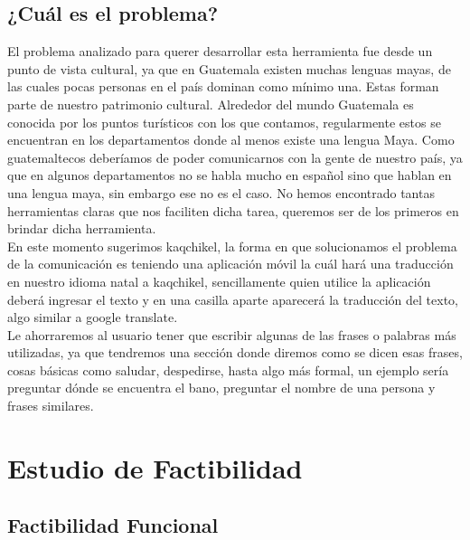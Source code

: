 \documentclass[a4paper,openright,11pt]{article}
\begin{document}
\subsection{¿Cuál es el problema?}
El problema analizado para querer desarrollar esta herramienta fue desde un punto de vista cultural, ya que en Guatemala existen muchas lenguas mayas, de las cuales pocas personas en el pa\'is dominan como m\'inimo una. Estas forman parte de nuestro patrimonio cultural. Alrededor del mundo Guatemala es conocida por los puntos tur\'isticos con los que contamos, regularmente estos se encuentran en los departamentos donde al menos existe una lengua Maya.  Como guatemaltecos deber\'iamos de poder comunicarnos con la gente de nuestro pa\'is, ya que en algunos departamentos no se habla mucho en espa\~nol sino que hablan en una lengua maya, sin embargo ese no es el caso. No hemos encontrado tantas herramientas claras que nos faciliten dicha tarea, queremos ser de los primeros en brindar dicha herramienta.\\

En este momento sugerimos kaqchikel, la forma en que solucionamos el problema de la comunicación es teniendo una aplicación m\'ovil la cu\'al har\'a una traducción en nuestro idioma natal a kaqchikel, sencillamente quien utilice la aplicación deberá ingresar el texto y en una casilla aparte aparecer\'a la traducci\'on del texto, algo similar a google translate.\\

Le ahorraremos al usuario tener que escribir algunas de las frases o palabras m\'as utilizadas, ya que tendremos una secci\'on donde diremos como se dicen esas frases, cosas b\'asicas como saludar, despedirse, hasta algo m\'as formal, un ejemplo ser\'ia preguntar d\'onde se encuentra el bano, preguntar el nombre de una persona y frases similares.\\
\newpage

\section{Estudio de Factibilidad}
\subsection{Factibilidad Funcional}
\end{document}
